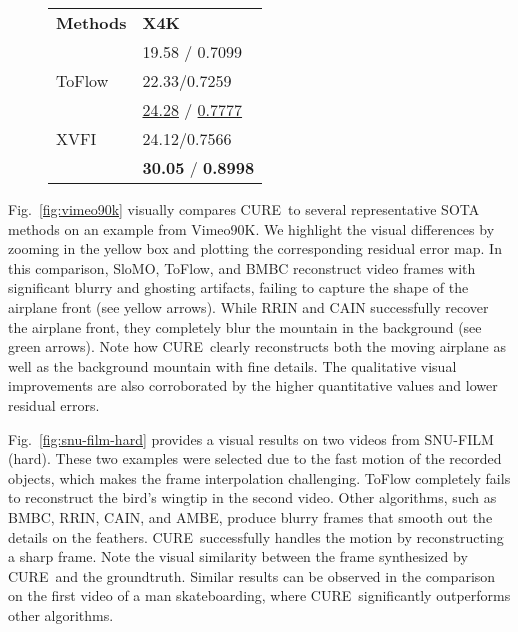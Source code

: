 \documentclass[12pt]{article}
\newcommand{\first}[1]{{\color{red} \textbf{#1}}}
\newcommand{\second}[1]{{\color{lightblue} \underline{#1}}}
\def\proposed{CURE}
\begin{document}
\begin{wrapfigure}{O}{0.35\textwidth}
\centering
  \scriptsize
  \renewcommand\arraystretch{1.5}
  \begin{tabularx}{0.31\textwidth}{C{.125\textwidth}|C{.16\textwidth}}
    \toprule
    \textbf{Methods} & \textbf{X4K}\\
     & {19.58 / 0.7099}\\
    {ToFlow} & {22.33/0.7259} \\ 
     & {\second{24.28}  / \second{0.7777}} \\
    {XVFI} & {24.12/0.7566} \\
     & {\first{30.05}  / \first{0.8998}}\\                       
    \bottomrule
    \end{tabularx}
    \label{tb:time}
\vspace{-5ex}
\end{wrapfigure} 

Fig.~\ref{fig:vimeo90k} visually compares \proposed~to several representative SOTA methods on an example from Vimeo90K. We highlight the visual differences by zooming in the yellow box and plotting the corresponding residual error map. In this comparison, SloMO, ToFlow, and BMBC reconstruct video frames with significant blurry and ghosting artifacts, failing to capture the shape of the airplane front (see yellow arrows). While RRIN and CAIN successfully recover the airplane front, they completely blur the mountain in the background (see green arrows). Note how \proposed~clearly reconstructs both the moving airplane as well as the background mountain with fine details. The qualitative visual improvements are also corroborated by the higher quantitative values and lower residual errors.

Fig.~\ref{fig:snu-film-hard} provides a visual results on two videos from SNU-FILM (hard). These two examples were selected due to the fast motion of the recorded objects, which makes the frame interpolation challenging. ToFlow completely fails to reconstruct the bird's wingtip in the second video. Other algorithms, such as BMBC, RRIN, CAIN, and AMBE, produce blurry frames that smooth out the details on the feathers. \proposed~successfully handles the motion by reconstructing a sharp frame. Note the visual similarity between the frame synthesized by \proposed~and the groundtruth. Similar results can be observed in the comparison on the first video of a man skateboarding, where \proposed~significantly outperforms other algorithms.
\end{document}
